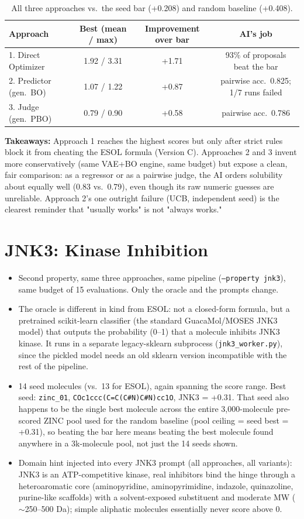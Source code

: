 \documentclass[11pt,a4paper]{article}
\begin{document}
\begin{table}[h]
\centering
\begin{tabular}{lccc}
\hline
Approach & Best (mean / max) & Improvement over bar & AI's job \\
\hline
1. Direct Optimizer      & 1.92 / 3.31 & +1.71 & 93\% of proposals beat the bar \\
2. Predictor (gen.\ BO)  & 1.07 / 1.22 & +0.87 & pairwise acc.\ 0.825; 1/7 runs failed \\
3. Judge (gen.\ PBO)     & 0.79 / 0.90 & +0.58 & pairwise acc.\ 0.786 \\
\hline
\end{tabular}
\caption{All three approaches vs.\ the seed bar (+0.208) and random baseline (+0.408).}
\label{tab:comparison}
\end{table}

\textbf{Takeaways:} Approach 1 reaches the highest scores but only after strict rules block it from cheating the ESOL formula (Version C). Approaches 2 and 3 invent more conservatively (same VAE+BO engine, same budget) but expose a clean, fair comparison: as a regressor or as a pairwise judge, the AI orders solubility about equally well (0.83 vs.\ 0.79), even though its raw numeric guesses are unreliable. Approach 2's one outright failure (UCB, independent seed) is the clearest reminder that "usually works" is not "always works."

\section{JNK3: Kinase Inhibition}
\begin{itemize}
    \item Second property, same three approaches, same pipeline (\texttt{--property jnk3}), same budget of 15 evaluations. Only the oracle and the prompts change.
    \item The oracle is different in kind from ESOL: not a closed-form formula, but a pretrained scikit-learn classifier (the standard GuacaMol/MOSES JNK3 model) that outputs the probability (0--1) that a molecule inhibits JNK3 kinase. It runs in a separate legacy-sklearn subprocess (\texttt{jnk3\_worker.py}), since the pickled model needs an old sklearn version incompatible with the rest of the pipeline.
    \item 14 seed molecules (vs.\ 13 for ESOL), again spanning the score range. Best seed: \texttt{zinc\_01}, \texttt{COc1ccc(C=C(C\#N)C\#N)cc1O}, JNK3 = +0.31. That seed also happens to be the single best molecule across the entire 3{,}000-molecule pre-scored ZINC pool used for the random baseline (pool ceiling = seed best = +0.31), so beating the bar here means beating the best molecule found anywhere in a 3k-molecule pool, not just the 14 seeds shown.
    \item Domain hint injected into every JNK3 prompt (all approaches, all variants): JNK3 is an ATP-competitive kinase, real inhibitors bind the hinge through a heteroaromatic core (aminopyridine, aminopyrimidine, indazole, quinazoline, purine-like scaffolds) with a solvent-exposed substituent and moderate MW ($\sim$250--500 Da); simple aliphatic molecules essentially never score above 0.
\end{itemize}
\end{document}
